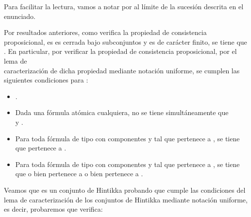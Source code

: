 \begin{isabellebody}
\begin{isamarkuptext}
  \begin{demostracion}
    Para facilitar la lectura, vamos a notar por  al límite de la sucesión  descrita 
    en el enunciado.

    Por resultados anteriores, como  verifica la propiedad de consistencia proposicional, es
    es cerrada bajo subconjuntos y es de carácter finito, se tiene que . En particular, por 
    verificar la propiedad de consistencia proposicional, por el lema de\\ caracterización de dicha
    propiedad mediante notación uniforme, se cumplen las siguientes condiciones para :

    \begin{itemize}
      \item {}.
      \item Dada  una fórmula atómica cualquiera, no se tiene 
      simultáneamente que\\  y .
      \item Para toda fórmula de tipo \isa{{\isasymalpha}} con componentes  y  tal que \isa{{\isasymalpha}}
      pertenece a , se tiene que  pertenece a .
      \item Para toda fórmula de tipo \isa{{\isasymbeta}} con componentes  y  tal que \isa{{\isasymbeta}}
      pertenece a , se tiene que o bien  pertenece a  o 
      bien  pertenece a .
    \end{itemize}

    Veamos que  es un conjunto de Hintikka probando que cumple las condiciones del
    lema de caracterización de los conjuntos de Hintikka mediante notación uniforme, es decir,
    probaremos que  verifica:


\end{demostracion}
\end{isamarkuptext}
\end{isabellebody}
